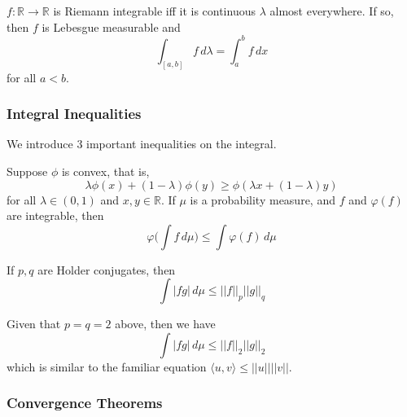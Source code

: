     \begin{theorem}
      $f: \mathbb{R} \longrightarrow \mathbb{R}$ is Riemann integrable iff it is continuous $\lambda$ almost everywhere. If so, then $f$ is Lebesgue measurable and 
      \begin{equation}
        \int_{[a, b]} f \,d\lambda = \int_a^b f \, dx
      \end{equation}
      for all $a < b$. 
    \end{theorem}

  \subsubsection{Integral Inequalities}

    We introduce 3 important inequalities on the integral. 

    \begin{theorem}
      Suppose $\phi$ is convex, that is, 
      \begin{equation}
        \lambda \phi(x) + (1 - \lambda) \phi(y) \geq \phi (\lambda x + (1 - \lambda) y)
      \end{equation}
      for all $\lambda \in (0, 1)$ and $x, y \in \mathbb{R}$. If $\mu$ is a probability measure, and $f$ and $\varphi(f)$ are integrable, then 
      \begin{equation}
        \varphi\bigg( \int f \,d\mu \bigg) \leq \int \varphi(f) \,d\mu
      \end{equation}
    \end{theorem}

    \begin{theorem}
      If $p, q$ are Holder conjugates, then 
      \begin{equation}
        \int |f g|\, d\mu \leq ||f||_p ||g||_q
      \end{equation}
    \end{theorem}

    \begin{corollary}
      Given that $p = q = 2$ above, then we have 
      \begin{equation}
        \int |f g|\, d\mu \leq ||f||_2 ||g||_2
      \end{equation}
      which is similar to the familiar equation $\langle u, v \rangle \leq ||u|| ||v||$. 
    \end{corollary}

  \subsubsection{Convergence Theorems}

